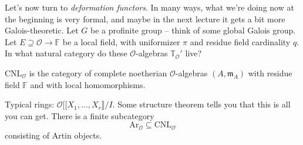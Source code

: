 \documentclass[reqno]{amsart} 
\begin{document}
Let's now turn to \emph{deformation functors}.  In many ways, what we're doing now at the beginning is very formal, and maybe in the next lecture it gets a bit more Galois-theoretic.  Let $G$ be a profinite group -- think of some global Galois group.  Let $E \supseteq \mathcal{O} \rightarrow \mathbb{F}$ be a local field, with uniformizer $\pi$ and residue field cardinality $q$.  In what natural category do these $\mathcal{O}$-algebras $\mathbb{T}_{\mathcal{O}}'$ live?
\begin{definition}\label{definition:cq6thpm6f8}
  $\mathrm{C N L }_{\mathcal{O}}$ is the category of complete noetherian $\mathcal{O}$-algebras $(A, \mathfrak{m}_{A})$ with residue field $\mathbb{F}$ and with local homomorphisms.
\end{definition}
Typical rings: $\mathcal{O} [[ X_1, \dotsc, X_r\rrbracket / I$.  Some structure theorem tells you that this is all you can get.  There is a finite subcategory
\begin{equation*}
  \mathrm{Ar}_{\mathcal{O}} \subseteq \mathrm{C N L}_{\mathcal{O}}
\end{equation*}
consisting of Artin objects.
\end{document}
